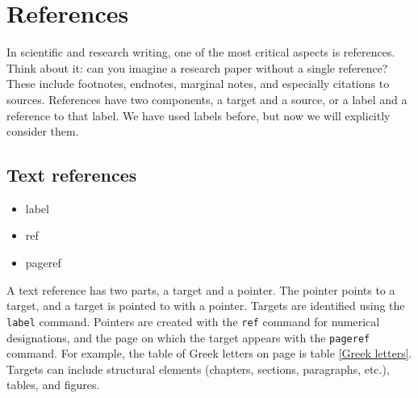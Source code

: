     
    \section{References}
    \label{References}

    In scientific and research writing, one of the most critical aspects is references. Think about it: can you imagine a research paper without a single reference? These include footnotes, endnotes, marginal notes, and especially citations to sources. References have two components, a target and a source, or a label and a reference to that label. We have used labels before, but now we will explicitly consider them.

    \subsection{Text references}
    \label{Text references}

        \begin{framed}
            \begin{itemize}
                \item{label}
                \item{ref}
                \item{pageref}
            \end{itemize}
        \end{framed}

        A text reference has two parts, a target and a pointer. The pointer points to a target, and a target is pointed to with a pointer. Targets are identified using the \texttt{label} command. Pointers are created with the \texttt{ref} command for numerical designations, and the page on which the target appears with the \texttt{pageref} command. For example, the table of Greek letters on page \pageref{Greek letters} is table \ref{Greek letters}. Targets can include structural elements (chapters, sections, paragraphs, etc.), tables, and figures.

